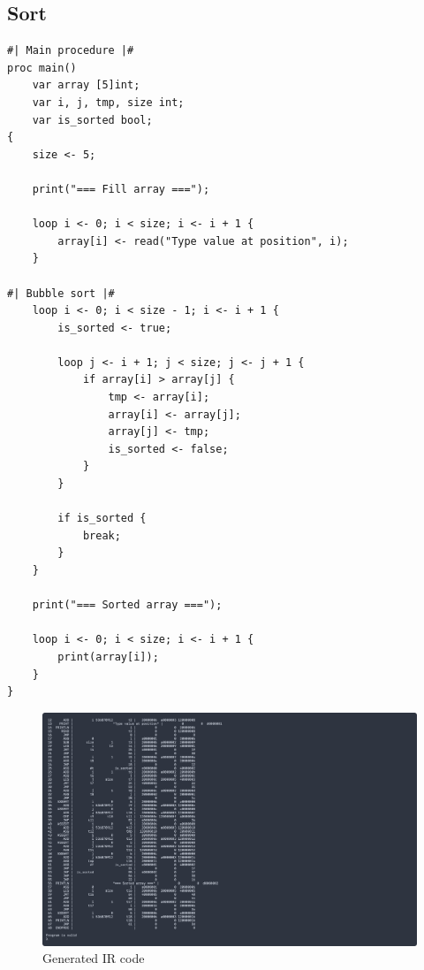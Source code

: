\newpage

\subsection{Sort}

\begin{verbatim}
#| Main procedure |#
proc main()
    var array [5]int;
    var i, j, tmp, size int;
    var is_sorted bool;
{
    size <- 5;

    print("=== Fill array ===");

    loop i <- 0; i < size; i <- i + 1 {
        array[i] <- read("Type value at position", i);
    }

#| Bubble sort |#
    loop i <- 0; i < size - 1; i <- i + 1 {
        is_sorted <- true;

        loop j <- i + 1; j < size; j <- j + 1 {
            if array[i] > array[j] {
                tmp <- array[i];
                array[i] <- array[j];
                array[j] <- tmp;
                is_sorted <- false;
            }
        }

        if is_sorted {
            break;
        }
    }
    
    print("=== Sorted array ===");

    loop i <- 0; i < size; i <- i + 1 {
        print(array[i]);
    }
}
\end{verbatim}

\begin{figure}[H]
    \centering
    \caption{Generated IR code}
    \includegraphics[width=\textwidth]{evidences/sort_ir}
\end{figure}

